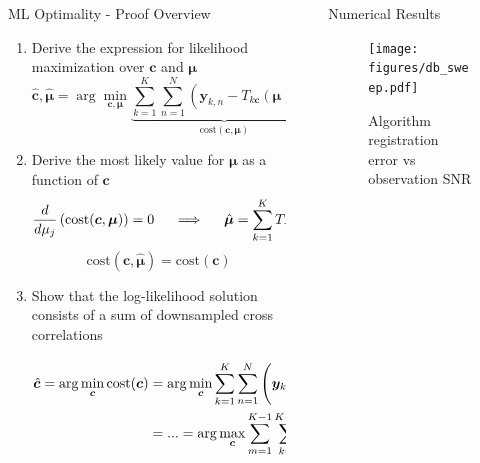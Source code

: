 \documentclass[final]{beamer}
\newlength{\sepwidth}
\newlength{\colwidth}
\newcommand{\separatorcolumn}{\begin{column}{\sepwidth}\end{column}}
\newcommand\lstar{\mkern4mu{\star}\mkern4mu}
\begin{document}
\begin{frame}[t]
\begin{columns}[t]
\begin{column}{\colwidth}
  \begin{block}{ML Optimality - Proof Overview}
    \begin{enumerate}
    \item Derive the expression for likelihood maximization over $\bm{c}$ and $\bm{\mu}$
      $$
        \hat{\bm{c}}, \hat{\bm{\mu}} =
        \arg\min_{\bm{c}, \bm{\mu}}
        \underbrace{\sum_{k=1}^K \sum_{n=1}^N (\bm{y}_{k,n} - T_{k\bm{c}}(\bm{\mu})_n)^2}_{\text{cost}(\bm{c}, \bm{\mu})}
      $$

    \item Derive the most likely value for $\bm{\mu}$ as a function of $\bm{c}$
      $$
        \frac{d}{d\mu_j}\left(\text{cost}(\bm{c}, \bm{\mu})\right) = 0 \nonumber
        \hspace{0.5cm} \Longrightarrow \hspace{0.5cm}
        \hat{\bm{\mu}} = \sum_{k=1}^K T_{-k\bm{c}}(\bm{y}_k)
      $$
      $$\text{cost}(\bm{c}, \hat{\bm{\mu}}) = \text{cost}(\bm{c})$$

    \item Show that the log-likelihood solution consists of a sum of downsampled cross correlations

        \vspace*{-1cm}
        $$\begin{aligned}
        \hat{\bm{c}} = \arg\min_{\bm{c}} \text{cost}(\bm{c})
        &=\arg\min_{\bm{c}}\sum_{k=1}^K \sum_{n=1}^N \left(\bm{y}_{k,n} - T_{k\bm{c}}\left(\sum_{l=1}^K T_{-l\bm{c}}(\bm{y}_l)\right)_n\right)^2 \\
        &= ... = \arg\max_{\bm{c}} \sum_{m=1}^{K-1} \sum_{k=1}^{K-m} (\bm{y}_k \lstar \bm{y}_{k+m})[m\bm{c}]
        \end{aligned}$$

    \end{enumerate}
  \end{block}

\end{column}

\separatorcolumn

\begin{column}{\colwidth}

  \begin{block}{Numerical Results}
    \begin{figure}
    \texttt{[image: figures/db\_sweep.pdf]}
    \vspace*{-3cm}
    \caption{Algorithm registration error vs observation SNR}
    \end{figure}


\end{block}
\end{column}
\end{columns}
\end{frame}
\end{document}
